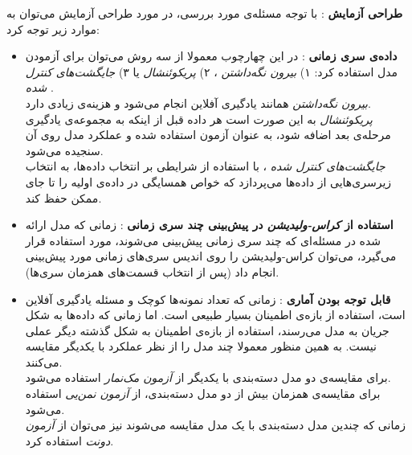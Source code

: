 \textbf{
طراحی آزمایش
}: 
با توجه مسئله‌ی مورد بررسی، در مورد طراحی آزمایش می‌توان به موارد زیر توجه کرد:
\begin{itemize}
\item \textbf{
داده‌ی سری زمانی
}: 
در این چهارچوب معمولا از سه روش می‌توان برای آزمودن مدل استفاده کرد: ۱) 
\textit{
بیرون نگه‌داشتن
}، 
۲) 
\textit{
پریکوئنشال
} 
یا 
۳) 
\textit{
جایگشت‌های کنترل شده
}.\\
\textit{
بیرون نگه‌داشتن
} 
همانند یادگیری آفلاین انجام می‌شود و هزینه‌ی زیادی دارد.\\
\textit{
پریکوئنشال
} 
به این صورت است هر داده قبل از اینکه به مجموعه‌ی یادگیری مرحله‌ی بعد اضافه شود، به عنوان آزمون استفاده شده و عملکرد مدل روی آن سنجیده می‌شود.\\
\textit{
جایگشت‌های کنترل شده
}، 
با استفاده از شرایطی بر انتخاب داده‌ها، به انتخاب زیرسری‌هایی از داده‌ها می‌پردازد که خواص همسایگی در داده‌ی اولیه را تا جای ممکن حفظ کند.

\item \textbf{
استفاده از 
\textit{
کراس-ولیدیشن
} 
در پیش‌بینی چند سری زمانی
}: 
زمانی که مدل ارائه شده در مسئله‌ای که چند سری زمانی پیش‌بینی می‌شوند، مورد استفاده قرار می‌گیرد، می‌توان کراس-ولیدیشن را روی اندیس سری‌های زمانی مورد پیش‌بینی انجام داد (پس از انتخاب قسمت‌های همزمان سری‌ها).

\item \textbf{
قابل توجه بودن آماری
}: 
زمانی که تعداد نمونه‌ها کوچک و مسئله یادگیری آفلاین است، استفاده از بازه‌ی اطمینان بسیار طبیعی است. اما زمانی که داده‌ها به شکل جریان به مدل می‌رسند، استفاده از بازه‌ی اطمینان به شکل گذشته دیگر عملی نیست. به همین منظور معمولا چند مدل را از نظر عملکرد با یکدیگر مقایسه می‌کنند.\\
برای مقایسه‌ی دو مدل دسته‌بندی با یکدیگر از 
\textit{
آزمون مک‌نمار
} 
استفاده می‌شود.\\
برای مقایسه‌ی همزمان بیش از دو مدل دسته‌بندی، از 
\textit{
آزمون نمن‌یی
} 
استفاده می‌شود.\\
زمانی که چندین مدل دسته‌بندی با یک مدل مقایسه می‌شوند نیز می‌توان از 
\textit{
آزمون دونت
} 
استفاده کرد.

\end{itemize}



































